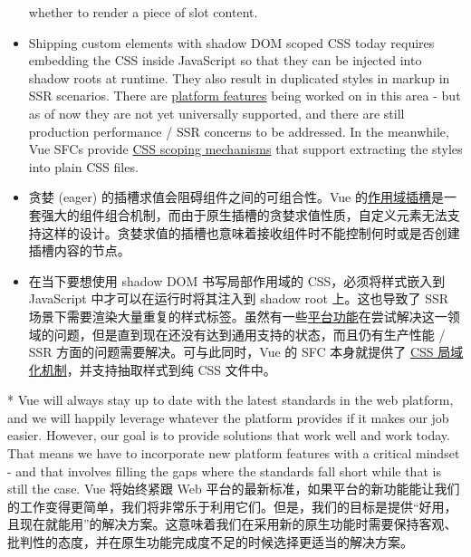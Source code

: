 \begin{paracol}{2}
\begin{itemize}
  whether to render a piece of slot content.
\item
  Shipping custom elements with shadow DOM scoped CSS today requires
  embedding the CSS inside JavaScript so that they can be injected into
  shadow roots at runtime. They also result in duplicated styles in
  markup in SSR scenarios. There are
  \href{https://github.com/whatwg/html/pull/4898/}{platform features}
  being worked on in this area - but as of now they are not yet
  universally supported, and there are still production performance /
  SSR concerns to be addressed. In the meanwhile, Vue SFCs provide
  \href{https://vuejs.org/api/sfc-css-features.html}{CSS scoping
  mechanisms} that support extracting the styles into plain CSS files.
\end{itemize}
\switchcolumn
\begin{itemize}
\item
  贪婪 (eager) 的插槽求值会阻碍组件之间的可组合性。Vue
  的\href{https://cn.vuejs.org/guide/components/slots.html\#scoped-slots}{作用域插槽}是一套强大的组件组合机制，而由于原生插槽的贪婪求值性质，自定义元素无法支持这样的设计。贪婪求值的插槽也意味着接收组件时不能控制何时或是否创建插槽内容的节点。
\item
  在当下要想使用 shadow DOM 书写局部作用域的 CSS，必须将样式嵌入到
  JavaScript 中才可以在运行时将其注入到 shadow root 上。这也导致了 SSR
  场景下需要渲染大量重复的样式标签。虽然有一些\href{https://github.com/whatwg/html/pull/4898/}{平台功能}在尝试解决这一领域的问题，但是直到现在还没有达到通用支持的状态，而且仍有生产性能
  / SSR 方面的问题需要解决。可与此同时，Vue 的 SFC 本身就提供了
  \href{https://cn.vuejs.org/api/sfc-css-features.html}{CSS
  局域化机制}，并支持抽取样式到纯 CSS 文件中。
\end{itemize}
\switchcolumn[0]*%
Vue will always stay up to date with the latest standards in the web
platform, and we will happily leverage whatever the platform provides if
it makes our job easier. However, our goal is to provide solutions that
work well and work today. That means we have to incorporate new platform
features with a critical mindset - and that involves filling the gaps
where the standards fall short while that is still the case.
\switchcolumn
Vue 将始终紧跟 Web
平台的最新标准，如果平台的新功能能让我们的工作变得更简单，我们将非常乐于利用它们。但是，我们的目标是提供``好用，且现在就能用''的解决方案。这意味着我们在采用新的原生功能时需要保持客观、批判性的态度，并在原生功能完成度不足的时候选择更适当的解决方案。
\end{paracol}

